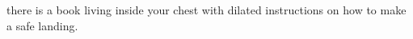 there is a book  
living inside your chest  
with dilated instructions on how to make a safe landing.
